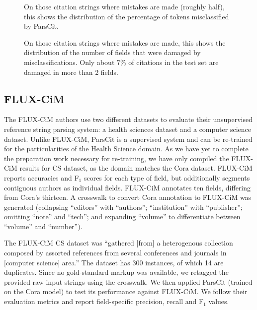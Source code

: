 \documentclass[10pt, a4paper]{article}
\begin{document}
\begin{figure}[htb]
\centering
{}
\caption{On those citation strings where mistakes are made
(roughly half), this shows the distribution of the percentage of
tokens misclassified by ParsCit.}
\label{f:errorPercents} 
\end{figure}

\begin{figure}[htb]
\centering
{}
\caption{On those citation strings where mistakes are made, this
shows the distribution of the number of fields that were damaged by
misclassifications.  Only about 7\% of citations in the test set are
damaged in more than 2 fields.}
\label{f:fieldErrors}
\end{figure}

\subsection{FLUX-CiM} 

The FLUX-CiM authors \cite{1255219} use two different datasets to
evaluate their unsupervised reference string parsing system: a health
sciences dataset and a computer science dataset.  Unlike FLUX-CiM,
ParsCit is a supervised system and can be re-trained for the
particularities of the Health Science domain.  As we have yet to
complete the preparation work necessary for re-training, we have only
compiled the FLUX-CiM results for CS dataset, as the domain matches
the Cora dataset.  FLUX-CiM reports accuracies and F$_1$ scores
for each type of field, but additionally segments contiguous authors
as individual fields.  FLUX-CiM annotates ten fields, differing
from Cora's thirteen.  A crosswalk to convert Cora annotation to
FLUX-CiM was generated (collapsing ``editors'' with ``authors'';
``institution'' with ``publisher''; omitting ``note'' and ``tech'';
and expanding ``volume'' to differentiate between ``volume'' and
``number'').

The FLUX-CiM CS dataset was ``gathered [from] a heterogenous
collection composed by assorted references from several conferences
and journals in [computer science] area.''  The dataset has 300
instances, of which 14 are duplicates.  Since no gold-standard markup
was available, we retagged the provided raw input strings using the
crosswalk.  We then applied ParsCit (trained on the Cora model) to
test its performance against FLUX-CiM.  We follow their evaluation
metrics and report field-specific precision, recall and F$_1$ values.
\end{document}
